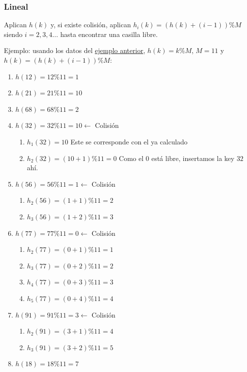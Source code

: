 \documentclass[10pt,a4paper,spanish]{report}
\begin{document}
\subsubsection{\textcolor[rgb]{0.3,0.4,0.8}Lineal}
\noindent
Aplican $h(k)$ y, si existe colisión, aplican $h_i (k) = (h(k) + (i-1)) \% M$ siendo $i = 2, 3, 4...$ hasta encontrar una casilla libre.

\noindent
Ejemplo: usando los datos del \hyperref[ejemplo_hash1]{ejemplo anterior}, $h(k) = k \% M$, $M = 11$ y $h(k) = (h(k) + (i-1)) \% M$:

\begin{enumerate}[$\longrightarrow$]
      \item $h(12) = 12 \% 11 = 1$
      \item $h(21) = 21 \% 11 = 10$
      \item $h(68) = 68 \% 11 = 2$
      \item $h(32) = 32 \% 11 = 10 \longleftarrow$ Colisión
      \begin{enumerate}[$\diamond$]
            \item $h_1 (32) = 10$ Este se corresponde con el ya calculado
            \item $h_2 (32) = (10+1) \% 11 = 0$ Como el $0$ está libre, insertamos la key $32$ ahí.
      \end{enumerate}
      \item $h(56) = 56 \% 11 = 1 \longleftarrow$ Colisión
      \begin{enumerate}[$\diamond$]
            \item $h_2 (56) = (1+1) \% 11 = 2$
            \item $h_3 (56) = (1+2) \% 11 = 3$
      \end{enumerate}
      \item $h(77) = 77 \% 11 = 0 \longleftarrow$ Colisión
      \begin{enumerate}[$\diamond$]
            \item $h_2 (77) = (0+1) \% 11 = 1$
            \item $h_3 (77) = (0+2) \% 11 = 2$
            \item $h_4 (77) = (0+3) \% 11 = 3$
            \item $h_5 (77) = (0+4) \% 11 = 4$
      \end{enumerate}
      \item $h(91) = 91 \% 11 = 3 \longleftarrow$ Colisión
      \begin{enumerate}[$\diamond$]
            \item $h_2 (91) = (3+1) \% 11 = 4$
            \item $h_3 (91) = (3+2) \% 11 = 5$
      \end{enumerate}
      \item $h(18) = 18 \% 11 = 7$
\end{enumerate}
\end{document}
